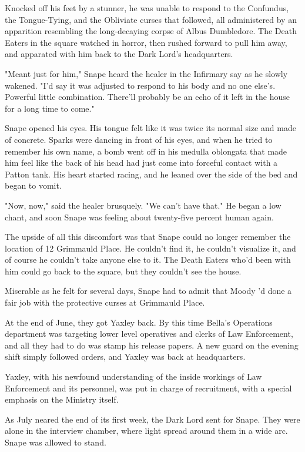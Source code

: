 \documentclass[a4paper,11pt]{article}
\begin{document}
Knocked off his feet by a stunner, he was unable to respond to the Confundus, the Tongue-Tying, and the Obliviate curses that followed, all administered by an apparition resembling the long-decaying corpse of Albus Dumbledore. The Death Eaters in the square watched in horror, then rushed forward to pull him away, and apparated with him back to the Dark Lord's headquarters.

"Meant just for him," Snape heard the healer in the Infirmary say as he slowly wakened. "I'd say it was adjusted to respond to his body and no one else's. Powerful little combination. There'll probably be an echo of it left in the house for a long time to come."

Snape opened his eyes. His tongue felt like it was twice its normal size and made of concrete. Sparks were dancing in front of his eyes, and when he tried to remember his own name, a bomb went off in his medulla oblongata that made him feel like the back of his head had just come into forceful contact with a Patton tank. His heart started racing, and he leaned over the side of the bed and began to vomit.

"Now, now," said the healer brusquely. "We can't have that." He began a low chant, and soon Snape was feeling about twenty-five percent human again.

The upside of all this discomfort was that Snape could no longer remember the location of 12 Grimmauld Place. He couldn't find it, he couldn't visualize it, and of course he couldn't take anyone else to it. The Death Eaters who'd been with him could go back to the square, but they couldn't see the house.

Miserable as he felt for several days, Snape had to admit that Moody 'd done a fair job with the protective curses at Grimmauld Place.

At the end of June, they got Yaxley back. By this time Bella's Operations department was targeting lower level operatives and clerks of Law Enforcement, and all they had to do was stamp his release papers. A new guard on the evening shift simply followed orders, and Yaxley was back at headquarters.

Yaxley, with his newfound understanding of the inside workings of Law Enforcement and its personnel, was put in charge of recruitment, with a special emphasis on the Ministry itself.

As July neared the end of its first week, the Dark Lord sent for Snape. They were alone in the interview chamber, where light spread around them in a wide arc. Snape was allowed to stand.
\end{document}
